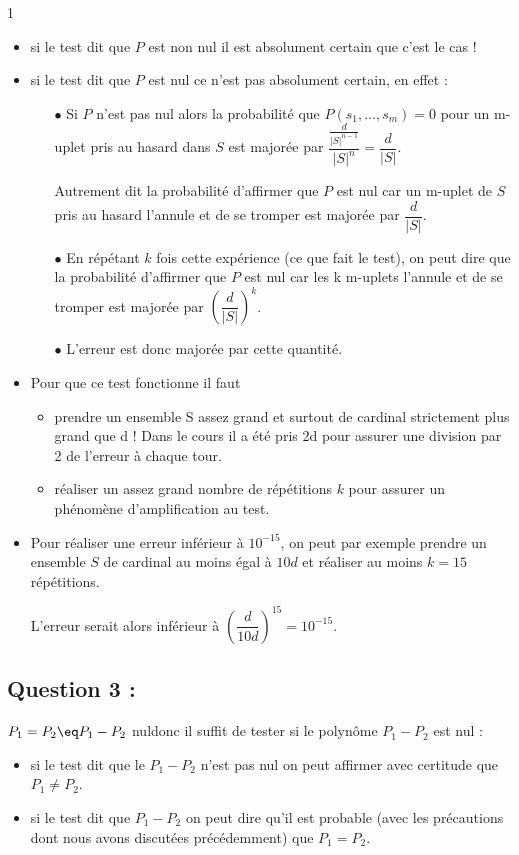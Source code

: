 1\documentclass[a4paper, 11pt,french]{article}
\begin{document}
\begin{itemize}
\item si le test dit que  $P$ est non nul il est absolument certain que c'est le cas !
\item si le test dit que $P$ est nul ce n'est pas absolument certain, en effet :
  \begin{itemize}
  \item[$\bullet$] Si $P$ n'est pas nul alors la probabilité que $P(s_1,\ldots,s_m)=0$ pour un m-uplet pris au hasard dans $S$ est majorée par $\dfrac{\frac{d}{|S|^{n-1}}}{|S|^n}=\dfrac{d}{|S|}$.

    Autrement dit la probabilité d'affirmer que $P$ est nul car un m-uplet de $S$ pris au hasard l'annule et de se tromper est majorée par $\dfrac{d}{|S|}$.
  \item[$\bullet$] En répétant $k$ fois cette expérience (ce que fait le test), on peut dire que la probabilité d'affirmer que $P$ est nul car les k m-uplets l'annule et de se tromper est majorée par $\left(\dfrac{d}{|S|}\right)^k$.

  \item[$\bullet$] L'erreur est donc majorée par cette quantité.

  \end{itemize}
\item Pour que ce test fonctionne il faut
  \begin{itemize}
  \item prendre un ensemble S assez grand et surtout de cardinal strictement plus grand que d ! Dans le cours il a été pris 2d pour assurer une division par 2 de l'erreur à chaque tour.
  \item réaliser un assez grand nombre de répétitions $k$ pour assurer un phénomène d'amplification au test.
  \end{itemize}

\item Pour réaliser une erreur inférieur à $10^{-15}$, on peut par exemple prendre un ensemble $S$ de cardinal au moins égal à $10d$ et réaliser au moins $k=15$ répétitions.

  L'erreur serait alors inférieur à $\left(\dfrac{d}{10d}\right)^{15}=10^{-15}$.
\end{itemize}

\subsection*{Question 3 :}
\og$P_1=P_2 \eq P_1-P_2$ nul\fg donc il suffit de tester si le polynôme $P_1-P_2$ est nul :
\begin{itemize}
\item si le test dit que le $P_1-P_2$ n'est pas nul on peut affirmer avec certitude que $P_1\neq P_2$.
\item si le test dit que $P_1-P_2$ on peut dire qu'il est probable (avec les précautions dont nous avons discutées précédemment) que $P_1=P_2$.
\end{itemize}
\end{document}
